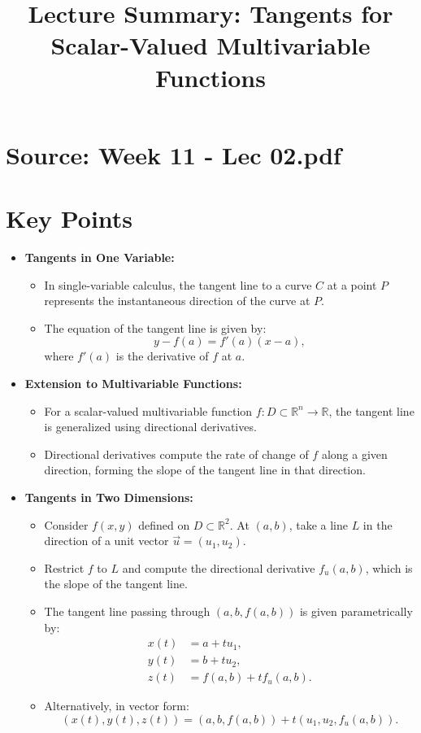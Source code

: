 \documentclass{article}
\title{Lecture Summary: Tangents for Scalar-Valued Multivariable Functions}
\author{}
\date{}
\begin{document}
\maketitle

\section*{Source: Week 11 - Lec 02.pdf}

\section*{Key Points}

\begin{itemize}
  \item \textbf{Tangents in One Variable:}
    \begin{itemize}
      \item In single-variable calculus, the tangent line to a curve $C$ at a point $P$ represents the instantaneous direction of the curve at $P$.
      \item The equation of the tangent line is given by:
        \[
          y - f(a) = f'(a)(x - a),
        \]
        where $f'(a)$ is the derivative of $f$ at $a$.
    \end{itemize}

  \item \textbf{Extension to Multivariable Functions:}
    \begin{itemize}
      \item For a scalar-valued multivariable function $f: D \subset \mathbb{R}^n \to \mathbb{R}$, the tangent line is generalized using directional derivatives.
      \item Directional derivatives compute the rate of change of $f$ along a given direction, forming the slope of the tangent line in that direction.
    \end{itemize}

  \item \textbf{Tangents in Two Dimensions:}
    \begin{itemize}
      \item Consider $f(x, y)$ defined on $D \subset \mathbb{R}^2$. At $(a, b)$, take a line $L$ in the direction of a unit vector $\vec{u} = (u_1, u_2)$.
      \item Restrict $f$ to $L$ and compute the directional derivative $f_u(a, b)$, which is the slope of the tangent line.
      \item The tangent line passing through $(a, b, f(a, b))$ is given parametrically by:
        \[
          \begin{aligned}
            x(t) &= a + t u_1, \\
            y(t) &= b + t u_2, \\
            z(t) &= f(a, b) + t f_u(a, b).
          \end{aligned}
        \]
      \item Alternatively, in vector form:
        \[
          (x(t), y(t), z(t)) = (a, b, f(a, b)) + t(u_1, u_2, f_u(a, b)).
        \]
    \end{itemize}


\end{itemize}
\end{document}
